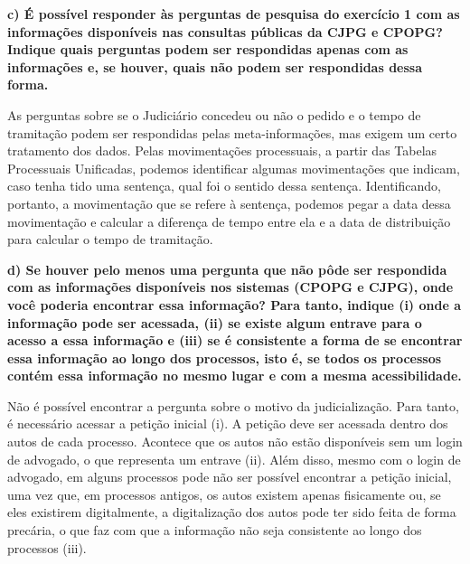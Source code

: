 \documentclass[
  letterpaper,
  DIV=11,
  numbers=noendperiod]{scrartcl}
\begin{document}
\textbf{c) É possível responder às perguntas de pesquisa do exercício 1
com as informações disponíveis nas consultas públicas da CJPG e CPOPG?
Indique quais perguntas podem ser respondidas apenas com as informações
e, se houver, quais não podem ser respondidas dessa forma.}

As perguntas sobre se o Judiciário concedeu ou não o pedido e o tempo de
tramitação podem ser respondidas pelas meta-informações, mas exigem um
certo tratamento dos dados. Pelas movimentações processuais, a partir
das Tabelas Processuais Unificadas, podemos identificar algumas
movimentações que indicam, caso tenha tido uma sentença, qual foi o
sentido dessa sentença. Identificando, portanto, a movimentação que se
refere à sentença, podemos pegar a data dessa movimentação e calcular a
diferença de tempo entre ela e a data de distribuição para calcular o
tempo de tramitação.

\textbf{d) Se houver pelo menos uma pergunta que não pôde ser respondida
com as informações disponíveis nos sistemas (CPOPG e CJPG), onde você
poderia encontrar essa informação? Para tanto, indique (i) onde a
informação pode ser acessada, (ii) se existe algum entrave para o acesso
a essa informação e (iii) se é consistente a forma de se encontrar essa
informação ao longo dos processos, isto é, se todos os processos contém
essa informação no mesmo lugar e com a mesma acessibilidade.}

Não é possível encontrar a pergunta sobre o motivo da judicialização.
Para tanto, é necessário acessar a petição inicial (i). A petição deve
ser acessada dentro dos autos de cada processo. Acontece que os autos
não estão disponíveis sem um login de advogado, o que representa um
entrave (ii). Além disso, mesmo com o login de advogado, em alguns
processos pode não ser possível encontrar a petição inicial, uma vez
que, em processos antigos, os autos existem apenas fisicamente ou, se
eles existirem digitalmente, a digitalização dos autos pode ter sido
feita de forma precária, o que faz com que a informação não seja
consistente ao longo dos processos (iii).
\end{document}
